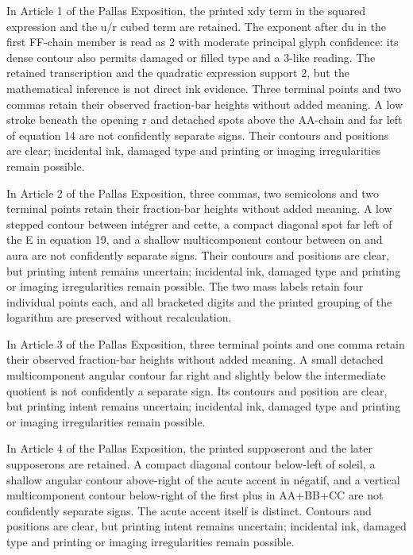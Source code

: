 In Article 1 of the Pallas Exposition, the printed xdy term in the squared expression and the u/r cubed term are retained. The exponent after du in the first FF-chain member is read as 2 with moderate principal glyph confidence: its dense contour also permits damaged or filled type and a 3-like reading. The retained transcription and the quadratic expression support 2, but the mathematical inference is not direct ink evidence. Three terminal points and two commas retain their observed fraction-bar heights without added meaning. A low stroke beneath the opening r and detached spots above the AA-chain and far left of equation 14 are not confidently separate signs. Their contours and positions are clear; incidental ink, damaged type and printing or imaging irregularities remain possible.

In Article 2 of the Pallas Exposition, three commas, two semicolons and two terminal points retain their fraction-bar heights without added meaning. A low stepped contour between intégrer and cette, a compact diagonal spot far left of the E in equation 19, and a shallow multicomponent contour between on and aura are not confidently separate signs. Their contours and positions are clear, but printing intent remains uncertain; incidental ink, damaged type and printing or imaging irregularities remain possible. The two mass labels retain four individual points each, and all bracketed digits and the printed grouping of the logarithm are preserved without recalculation.

In Article 3 of the Pallas Exposition, three terminal points and one comma retain their observed fraction-bar heights without added meaning. A small detached multicomponent angular contour far right and slightly below the intermediate quotient is not confidently a separate sign. Its contours and position are clear, but printing intent remains uncertain; incidental ink, damaged type and printing or imaging irregularities remain possible.

In Article 4 of the Pallas Exposition, the printed supposeront and the later supposerons are retained. A compact diagonal contour below-left of soleil, a shallow angular contour above-right of the acute accent in négatif, and a vertical multicomponent contour below-right of the first plus in AA+BB+CC are not confidently separate signs. The acute accent itself is distinct. Contours and positions are clear, but printing intent remains uncertain; incidental ink, damaged type and printing or imaging irregularities remain possible.

